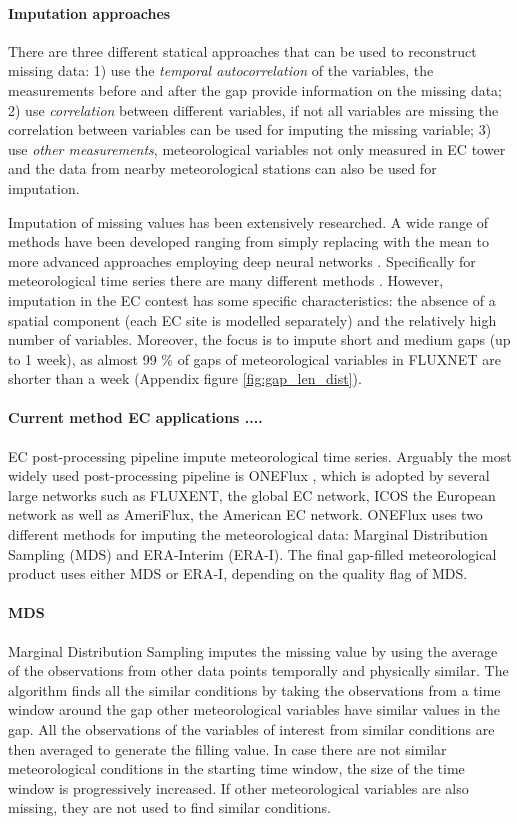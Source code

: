 \documentclass{article}
\begin{document}
\paragraph{Imputation approaches} There are three different statical approaches that can be used to reconstruct missing data: 1) use the \emph{temporal autocorrelation} of the variables, the measurements  before and after the gap provide information on the missing data; 2) use \emph{correlation} between different variables, if not all variables are missing the correlation between variables can be used for imputing the missing variable; 3) use \emph{other measurements}, meteorological variables not only measured in EC tower and the data from nearby meteorological stations can also be used for imputation.

Imputation of missing values has been extensively researched. A wide range of methods have been developed ranging from simply replacing with the mean to more advanced approaches employing deep neural networks \cite{fang_time_2020-1, buuren_mice_2011, du_saits_2022-1, zhang_dual-head_2021-2, cao_brits_nodate}. Specifically for meteorological time series there are many different methods \cite{costa_gap_2021, jing_multi-imputation_2022}. However, imputation in the EC contest has some specific characteristics: the absence of a spatial component (each EC site is modelled separately) and the relatively high number of variables. Moreover, the focus is to impute short and medium gaps (up to 1 week), as almost 99 \% of gaps of meteorological variables in FLUXNET are shorter than a week (Appendix figure \ref{fig:gap_len_dist}). 

\paragraph{Current method EC applications ....} EC post-processing pipeline impute meteorological time series. Arguably the most widely used post-processing pipeline is ONEFlux \cite{pastorello_fluxnet2015_2020}, which is adopted by several large networks such as FLUXENT, the global EC network, ICOS the European network as well as AmeriFlux, the American EC network.
ONEFlux uses two different methods for imputing the meteorological data: Marginal Distribution Sampling (MDS) and ERA-Interim (ERA-I). The final gap-filled meteorological product uses either MDS or ERA-I, depending on the quality flag of MDS.
\paragraph{MDS} Marginal Distribution Sampling \cite{reichstein_separation_2005-3} imputes the missing value by using the average of the observations from other data points temporally and physically similar. 
The algorithm finds all the similar conditions by taking the observations from a time window around the gap other meteorological variables have similar values in the gap.
All the observations of the variables of interest from similar conditions are then averaged to generate the filling value.
In case there are not similar meteorological conditions in the starting time window, the size of the time window is progressively increased. If other meteorological variables are also missing, they are not used to find similar conditions.
\end{document}
